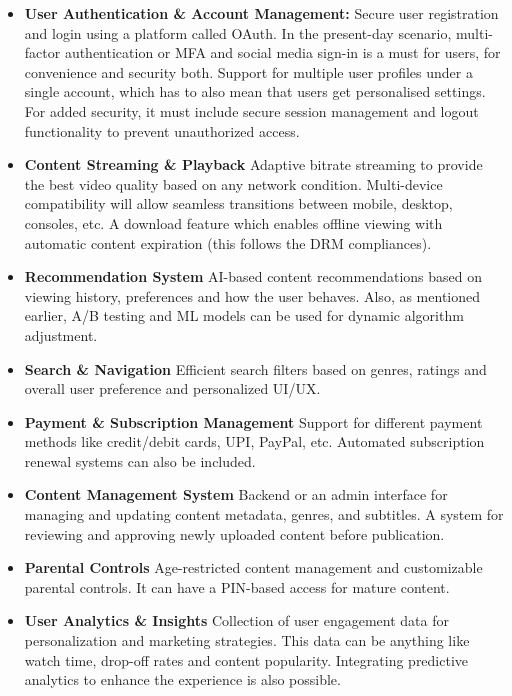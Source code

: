 \documentclass[a4paper,10pt,twoside]{article}
\begin{document}
\begin{itemize}
    \item \textbf{User Authentication \& Account Management:} Secure user registration and login using a platform called OAuth. In the present-day scenario, multi-factor authentication or MFA and social media sign-in is a must for users, for convenience and security both. Support for multiple user profiles under a single account, which has to also mean that users get personalised settings. For added security, it must include secure session management and logout functionality to prevent unauthorized access.
    \item \textbf{Content Streaming \& Playback} Adaptive bitrate streaming to provide the best video quality based on any network condition. Multi-device compatibility will allow seamless transitions between mobile, desktop, consoles, etc. A download feature which enables offline viewing with automatic content expiration (this follows the DRM compliances).
    \item \textbf{Recommendation System} AI-based content recommendations based on viewing history, preferences and how the user behaves. Also, as mentioned earlier, A/B testing and ML models can be used for dynamic algorithm adjustment.
    \item \textbf{Search \& Navigation} Efficient search filters based on genres, ratings and overall user preference and personalized UI/UX.
    \item \textbf{Payment \& Subscription Management} Support for different payment methods like credit/debit cards, UPI, PayPal, etc. Automated subscription renewal systems can also be included.
    \item \textbf{Content Management System} Backend or an admin interface for managing and updating content metadata, genres, and subtitles. A system for reviewing and approving newly uploaded content before publication.
    \item \textbf{Parental Controls} Age-restricted content management and customizable parental controls. It can have a PIN-based access for mature content.
    \item \textbf{User Analytics \& Insights} Collection of user engagement data for personalization and marketing strategies. This data can be anything like watch time, drop-off rates and content popularity. Integrating predictive analytics to enhance the experience is also possible.
\end{itemize}
\newpage
\end{document}
